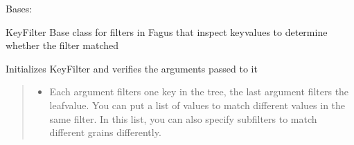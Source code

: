 \documentclass[a4paper,10pt,english]{sphinxmanual}
\begin{document}
\begin{fulllineitems}
\label{\detokenize{fagus.filters:fagus.filters.KFil}}
\pysigstartsignatures
{}
\pysigstopsignatures
\sphinxAtStartPar
Bases: {\hyperref[\detokenize{fagus.filters:fagus.filters.FilBase}]{}}

\sphinxAtStartPar
KeyFilter \sphinxhyphen{} Base class for filters in Fagus that inspect key\sphinxhyphen{}values to determine whether the filter matched

\begin{fulllineitems}
\label{\detokenize{fagus.filters:fagus.filters.KFil.__init__}}
\pysigstartsignatures
{}
\pysigstopsignatures
\sphinxAtStartPar
Initializes KeyFilter and verifies the arguments passed to it
\begin{quote}\begin{description}
\begin{itemize}
\item {}
\sphinxAtStartPar
{} \textendash{} Each argument filters one key in the tree, the last argument filters the leaf\sphinxhyphen{}value. You can
put a list of values to match different values in the same filter. In this list, you can also specify
subfilters to match different grains differently.


\end{itemize}
\end{description}
\end{quote}
\end{fulllineitems}
\end{fulllineitems}
\end{document}
